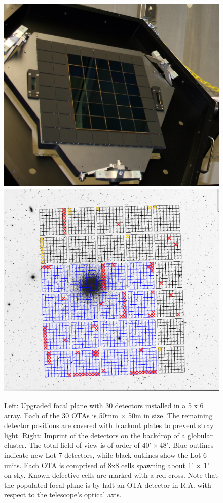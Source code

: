 \documentclass[]{spieman}
\begin{document}
\begin{figure}
	\centering
	\hfill
	\includegraphics[height=0.4\textwidth]{images/detectorsOnFocalPlane5x6.jpg}
	\hfill
	\includegraphics[height=0.4\textwidth]{images/5ODI_Imprint.png}
	\hfill \\[1ex]
	
	\caption{\label{fig_focalplane} Left: Upgraded focal plane with 30 
	detectors installed in a 5 x 6 array. Each of the 30 OTAs is 50mm 
	$\times$ 50m in size. The remaining detector positions are 
	covered with blackout plates to prevent stray light. Right: Imprint of the 
	detectors on the backdrop of a globular cluster. The total field of view is
	of order of $40'\times 48'$.  Blue outlines indicate new Lot 7 detectors,
	while black outlines show the Lot 6 units. Each OTA is comprised of 8x8 cells
	spawning about 1' $\times$ 1' on sky. Known defective cells are marked with a
	red cross. Note that the populated focal plane is by halt an OTA detector 
	in R.A. with respect to the telescope's optical axis. }
\end{figure}
\end{document}
